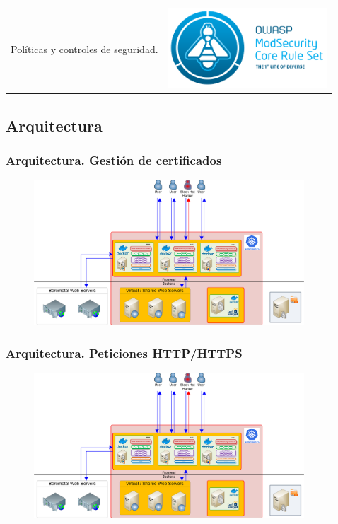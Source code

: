 \begin{frame}[shrink]
\begin{tabular}{ l c }
      Políticas y controles de seguridad.                         & \parbox[c]{5em}{\includegraphics[width=.30\textwidth,height=3cm,keepaspectratio]{fig/OWASPCRSLogo}} \\
    \end{tabular}
\end{frame}


\subsection{Arquitectura}
\begin{frame}[shrink]
  \frametitle{Arquitectura. Gestión de certificados}
  \begin{figure}
    \includegraphics[width=0.9\textwidth]{fig/Diagram_HTTP_Services}
  \end{figure}
\end{frame}

\begin{frame}[shrink]
  \frametitle{Arquitectura. Peticiones HTTP/HTTPS}
  \begin{figure}
    \includegraphics[width=0.9\textwidth]{fig/Diagram_HTTP_Services}
  \end{figure}
\end{frame}

